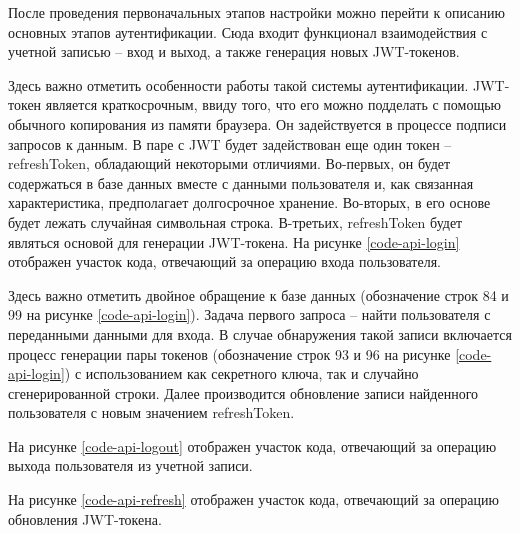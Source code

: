 
После проведения первоначальных этапов настройки можно перейти к описанию основных этапов аутентификации.
Сюда входит функционал взаимодействия с учетной записью -- вход и выход, а также генерация новых JWT-токенов.

Здесь важно отметить особенности работы такой системы аутентификации.
JWT-токен является краткосрочным, ввиду того, что его можно подделать с помощью обычного копирования из памяти браузера.
Он задействуется в процессе подписи запросов к данным.
В паре с JWT будет задействован еще один токен -- refreshToken, обладающий некоторыми отличиями.
Во-первых, он будет содержаться в базе данных вместе с данными пользователя и, как связанная характеристика, предполагает долгосрочное хранение.
Во-вторых, в его основе будет лежать случайная символьная строка.
В-третьих, refreshToken будет являться основой для генерации JWT-токена.
На рисунке \ref{code-api-login} отображен участок кода, отвечающий за операцию входа пользователя.


Здесь важно отметить двойное обращение к базе данных (обозначение строк 84 и 99 на рисунке \ref{code-api-login}).
Задача первого запроса -- найти пользователя с переданными данными для входа.
В случае обнаружения такой записи включается процесс генерации пары токенов (обозначение строк 93 и 96 на рисунке \ref{code-api-login}) с использованием как секретного ключа, так и случайно сгенерированной строки.
Далее производится обновление записи найденного пользователя с новым значением refreshToken.

На рисунке \ref{code-api-logout} отображен участок кода, отвечающий за операцию выхода пользователя из учетной записи.


На рисунке \ref{code-api-refresh} отображен участок кода, отвечающий за операцию обновления JWT-токена.


